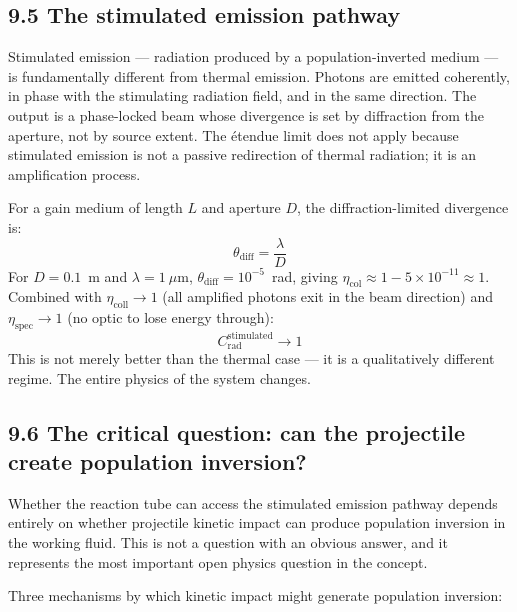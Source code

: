 \documentclass[12pt]{article}
\begin{document}
\subsection*{9.5 The stimulated emission pathway}

Stimulated emission — radiation produced by a population-inverted medium —
is fundamentally different from thermal emission. Photons are emitted coherently,
in phase with the stimulating radiation field, and in the same direction. The
output is a phase-locked beam whose divergence is set by diffraction from the
aperture, not by source extent. The \'{e}tendue limit does not apply because
stimulated emission is not a passive redirection of thermal radiation; it is
an amplification process.

For a gain medium of length $L$ and aperture $D$, the diffraction-limited
divergence is:
\[
  \theta_{\mathrm{diff}} = \frac{\lambda}{D}
\]
For $D = 0.1$~m and $\lambda = 1~\mu$m, $\theta_{\mathrm{diff}} = 10^{-5}$~rad,
giving $\eta_{\mathrm{col}} \approx 1 - 5 \times 10^{-11} \approx 1$. Combined
with $\eta_{\mathrm{coll}} \to 1$ (all amplified photons exit in the beam
direction) and $\eta_{\mathrm{spec}} \to 1$ (no optic to lose energy through):
\[
  C_{\mathrm{rad}}^{\mathrm{stimulated}} \to 1
\]
This is not merely better than the thermal case — it is a qualitatively
different regime. The entire physics of the system changes.

\subsection*{9.6 The critical question: can the projectile create population inversion?}

Whether the reaction tube can access the stimulated emission pathway depends
entirely on whether projectile kinetic impact can produce population inversion
in the working fluid. This is not a question with an obvious answer, and it
represents the most important open physics question in the concept.

Three mechanisms by which kinetic impact might generate population inversion:
\end{document}
